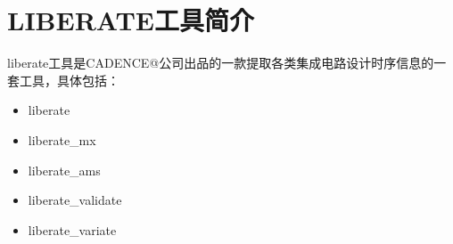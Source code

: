 \section{LIBERATE工具简介}
liberate工具是CADENCE@公司出品的一款提取各类集成电路设计时序信息的一套工具，具体包括：
\begin{itemize}
\item liberate
\item liberate\_mx
\item liberate\_ams
\item liberate\_validate
\item liberate\_variate
\end{itemize}
